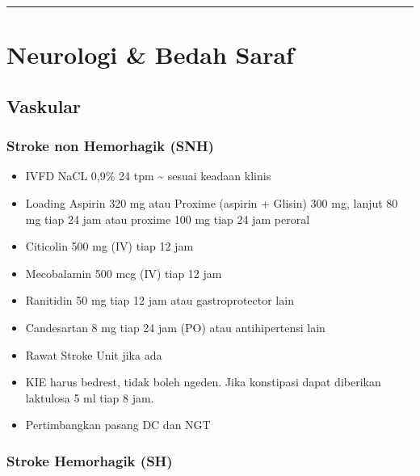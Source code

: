 \documentclass[
]{book}
\providecommand{\tightlist}{%
  \setlength{\itemsep}{0pt}\setlength{\parskip}{0pt}}
\begin{document}
\begin{center}\rule{0.5\linewidth}{0.5pt}\end{center}

\hypertarget{neurologi-bedah-saraf-1}{%
\section{Neurologi \& Bedah Saraf}\label{neurologi-bedah-saraf-1}}

\hypertarget{vaskular}{%
\subsection{Vaskular}\label{vaskular}}

\hypertarget{stroke-non-hemorhagik-snh}{%
\subsubsection{Stroke non Hemorhagik (SNH)}\label{stroke-non-hemorhagik-snh}}

\begin{itemize}
\tightlist
\item
  IVFD NaCL 0,9\% 24 tpm \textasciitilde{} sesuai keadaan klinis
\item
  Loading Aspirin 320 mg atau Proxime (aspirin + Glisin) 300 mg, lanjut 80 mg tiap 24 jam atau proxime 100 mg tiap 24 jam peroral
\item
  Citicolin 500 mg (IV) tiap 12 jam
\item
  Mecobalamin 500 mcg (IV) tiap 12 jam
\item
  Ranitidin 50 mg tiap 12 jam atau gastroprotector lain
\item
  Candesartan 8 mg tiap 24 jam (PO) atau antihipertensi lain
\item
  Rawat Stroke Unit jika ada
\item
  KIE harus bedrest, tidak boleh ngeden. Jika konstipasi dapat diberikan laktulosa 5 ml tiap 8 jam.
\item
  Pertimbangkan pasang DC dan NGT
\end{itemize}

\hypertarget{stroke-hemorhagik-sh}{%
\subsubsection{Stroke Hemorhagik (SH)}\label{stroke-hemorhagik-sh}}
\end{document}
